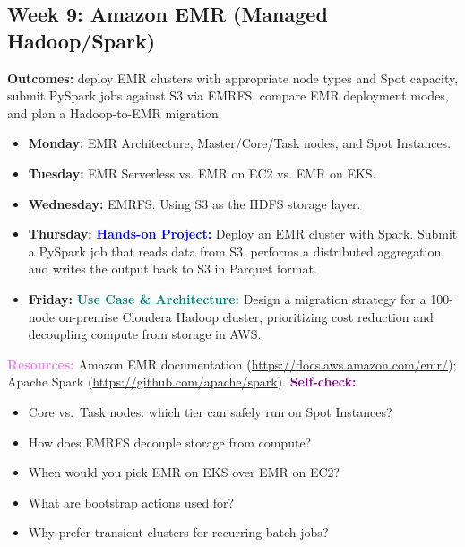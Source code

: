 \documentclass[11pt, a4paper]{article}
\newcommand{\project}[1]{\vspace{1mm}\noindent\textbf{\textcolor{blue}{Hands-on Project:}} #1}
\newcommand{\usecase}[1]{\vspace{1mm}\noindent\textbf{\textcolor{teal}{Use Case \& Architecture:}} #1}
\newcommand{\dayitem}[2]{\item \textbf{#1:} #2}
\newcommand{\resources}[1]{\vspace{1mm}\noindent\textbf{\textcolor{violet}{Resources:}} #1}
\newcommand{\selfcheck}[1]{\vspace{1mm}\noindent\textbf{\textcolor{purple}{Self-check:}} #1}
\begin{document}
\subsection*{Week 9: Amazon EMR (Managed Hadoop/Spark)}
\par\noindent\textbf{Outcomes:} deploy EMR clusters with appropriate node types and Spot capacity, submit PySpark jobs against S3 via EMRFS, compare EMR deployment modes, and plan a Hadoop-to-EMR migration.
\begin{itemize}[label=-]
    \dayitem{Monday}{EMR Architecture, Master/Core/Task nodes, and Spot Instances.}
    \dayitem{Tuesday}{EMR Serverless vs. EMR on EC2 vs. EMR on EKS.}
    \dayitem{Wednesday}{EMRFS: Using S3 as the HDFS storage layer.}
    \dayitem{Thursday}{\project{Deploy an EMR cluster with Spark. Submit a PySpark job that reads data from S3, performs a distributed aggregation, and writes the output back to S3 in Parquet format.}}
    \dayitem{Friday}{\usecase{Design a migration strategy for a 100-node on-premise Cloudera Hadoop cluster, prioritizing cost reduction and decoupling compute from storage in AWS.}}
\end{itemize}
\resources{Amazon EMR documentation (\url{https://docs.aws.amazon.com/emr/}); Apache Spark (\url{https://github.com/apache/spark}).}
\selfcheck{\begin{itemize}[label=-, leftmargin=1.5em, itemsep=0pt]
    \item Core vs.\ Task nodes: which tier can safely run on Spot Instances?
    \item How does EMRFS decouple storage from compute?
    \item When would you pick EMR on EKS over EMR on EC2?
    \item What are bootstrap actions used for?
    \item Why prefer transient clusters for recurring batch jobs?
\end{itemize}}
\end{document}
